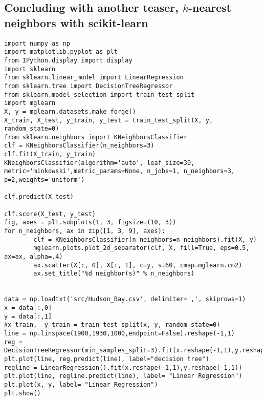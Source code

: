 \documentclass[%
oneside,                 %
final,                   %
10pt]{article}
\begin{document}
\subsection*{Concluding with another teaser, $k$-nearest neighbors with scikit-learn}

\begin{verbatim}
import numpy as np
import matplotlib.pyplot as plt
from IPython.display import display
import sklearn
from sklearn.linear_model import LinearRegression
from sklearn.tree import DecisionTreeRegressor
from sklearn.model_selection import train_test_split
import mglearn
X, y = mglearn.datasets.make_forge()
X_train, X_test, y_train, y_test = train_test_split(X, y, random_state=0)
from sklearn.neighbors import KNeighborsClassifier
clf = KNeighborsClassifier(n_neighbors=3)
clf.fit(X_train, y_train)
KNeighborsClassifier(algorithm='auto', leaf_size=30, metric='minkowski',metric_params=None, n_jobs=1, n_neighbors=3, p=2,weights='uniform')

clf.predict(X_test)

clf.score(X_test, y_test)
fig, axes = plt.subplots(1, 3, figsize=(10, 3))
for n_neighbors, ax in zip([1, 3, 9], axes):
        clf = KNeighborsClassifier(n_neighbors=n_neighbors).fit(X, y)
        mglearn.plots.plot_2d_separator(clf, X, fill=True, eps=0.5, ax=ax, alpha=.4)
        ax.scatter(X[:, 0], X[:, 1], c=y, s=60, cmap=mglearn.cm2)
        ax.set_title("%d neighbor(s)" % n_neighbors)


data = np.loadtxt('src/Hudson_Bay.csv', delimiter=',', skiprows=1)
x = data[:,0]
y = data[:,1]
#x_train,  y_train = train_test_split(x, y, random_state=0)
line = np.linspace(1900,1930,1000,endpoint=False).reshape(-1,1)
reg = DecisionTreeRegressor(min_samples_split=3).fit(x.reshape(-1,1),y.reshape(-1,1))
plt.plot(line, reg.predict(line), label="decision tree")
regline = LinearRegression().fit(x.reshape(-1,1),y.reshape(-1,1))
plt.plot(line, regline.predict(line), label= "Linear Regression")
plt.plot(x, y, label= "Linear Regression")
plt.show()

\end{verbatim}

\end{document}
